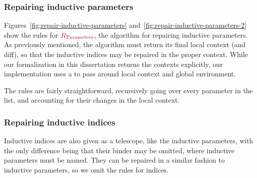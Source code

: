 \subsubsection{Repairing inductive parameters}





Figures~\ref{fig:repair-inductive-parameters}
and~\ref{fig:repair-inductive-parameters-2} show the rules for
$\textcolor{purple}{R_{\text{Parameters}}}{}$, the algorithm for repairing inductive parameters.  As
previously mentioned, the algorithm must return its final local context (and
diff), so that the inductive indices may be repaired in the proper context.
While our formalization in this dissertation returns the contexts explicitly,
our implementation uses a  to pass around local context and
global environment.

The rules are fairly straightforward, recursively going over every parameter in
the list, and accounting for their changes in the local context.

\subsubsection{Repairing inductive indices}

Inductive indices are also given as a telescope, like the inductive parameters,
with the only difference being that their binder may be omitted, where inductive
parameters must be named.  They can be repaired in a similar fashion to
inductive parameters, so we omit the rules for indices.
